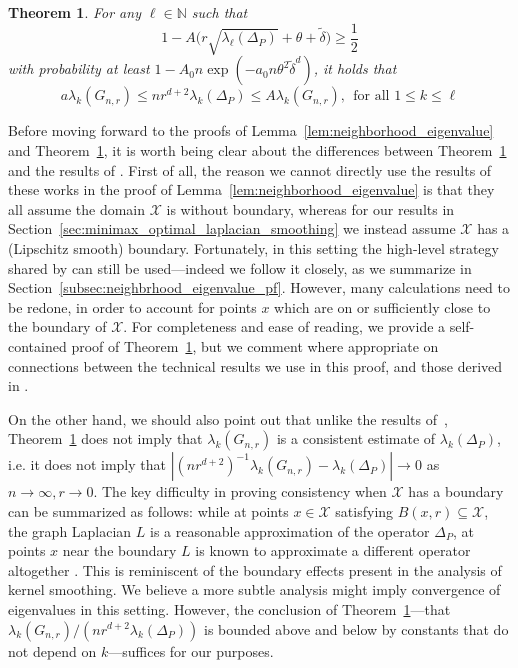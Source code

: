 \documentclass[twoside]{article}
\newcommand{\1}{\mathbf{1}}
\newcommand{\mc}[1]{\mathcal{#1}}
\newcommand{\wt}[1]{\widetilde{#1}}
\newtheorem{theorem}{Theorem}
\theoremstyle{definition}
\theoremstyle{remark}
\begin{document}
\begin{theorem}
	\label{thm:neighborhood_eigenvalue}
	For any $\ell \in \mathbb{N}$ such that
	\begin{equation}
	\label{eqn:neighborhood_eigenvalue_1}
	1 - A\Biggl(r \sqrt{\lambda_{\ell}(\Delta_P)} + \theta + \wt{\delta}\Biggr)\geq \frac{1}{2}
	\end{equation}
	with probability at least $1 - A_0n\exp(-a_0n\theta^2\wt{\delta}^{d})$, it holds that
	\begin{equation}
	\label{eqn:eigenvalue_bound}
	a \lambda_k(G_{n,r}) \leq nr^{d+2} \lambda_k(\Delta_P) \leq A \lambda_k(G_{n,r}),~~\textrm{for all $1 \leq k \leq \ell$}
	\end{equation}
\end{theorem}
Before moving forward to the proofs of Lemma~\ref{lem:neighborhood_eigenvalue} and Theorem~\ref{thm:neighborhood_eigenvalue}, it is worth being clear about the differences between Theorem~\ref{thm:neighborhood_eigenvalue} and the results of \citet{burago2014,trillos2019,calder2019}. First of all, the reason we cannot directly use the results of these works in the proof of Lemma~\ref{lem:neighborhood_eigenvalue} is that they all assume the domain $\mc{X}$ is without boundary, whereas for our results in Section~\ref{sec:minimax_optimal_laplacian_smoothing} we instead assume $\mc{X}$ has a (Lipschitz smooth) boundary. Fortunately, in this setting the high-level strategy shared by \citet{burago2014,trillos2019,calder2019} can still be used---indeed we follow it closely, as we summarize in Section~\ref{subsec:neighbrhood_eigenvalue_pf}. However, many calculations need to be redone, in order to account for points $x$ which are on or sufficiently close to the boundary of $\mc{X}$. For completeness and ease of reading, we provide a self-contained proof of Theorem~\ref{thm:neighborhood_eigenvalue}, but we comment where appropriate on connections between the technical results we use in this proof, and those derived in \citet{burago2014,trillos2019,calder2019}.

On the other hand, we should also point out that unlike the results of~\citet{burago2014,trillos2019,calder2019}, Theorem~\ref{thm:neighborhood_eigenvalue} does not imply that $\lambda_{k}(G_{n,r})$ is a consistent estimate of $\lambda_k(\Delta_P)$, i.e. it does not imply that $|(nr^{d + 2})^{-1}\lambda_{k}(G_{n,r}) - \lambda_k(\Delta_P)| \to 0$ as $n \to \infty, r \to 0$. The key difficulty in proving consistency when $\mc{X}$ has a boundary can be summarized as follows: while at points $x \in \mc{X}$ satisfying $B(x,r) \subseteq \mc{X}$, the graph Laplacian $L$ is a reasonable approximation of the operator $\Delta_P$, at points $x$ near the boundary $L$ is known to approximate a different operator altogether \citep{belkin2012}. This is reminiscent of the boundary effects present in the analysis of kernel smoothing. We believe a more subtle analysis might imply convergence of eigenvalues in this setting. However, the conclusion of Theorem~\ref{thm:neighborhood_eigenvalue}---that $\lambda_k(G_{n,r})/(nr^{d + 2}\lambda_k(\Delta_P))$ is bounded above and below by constants that do not depend on $k$---suffices for our purposes.  
\end{document}
